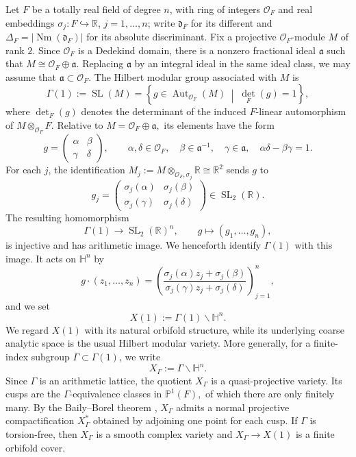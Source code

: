 \documentclass[12 pt]{amsart}
\theoremstyle{definition}
\newcommand{\Nm}{\operatorname{Nm}}
\newcommand{\Hu}{\mathbb{H}}
\begin{document}
Let $F$ be a totally real field of degree $n$, with ring of integers $\mathcal O_F$ and real embeddings $\sigma_j:F\hookrightarrow\mathbb R$, $j=1,\ldots,n$; write \(\mathfrak d_F\) for its different and \(\Delta_F=|\Nm(\mathfrak d_F)|\) for its absolute discriminant. Fix a projective $\mathcal O_F$-module $M$ of rank $2$. Since $\mathcal O_F$ is a Dedekind domain, there is a nonzero fractional ideal $\mathfrak a$ such that $M\cong\mathcal O_F\oplus\mathfrak a$. Replacing $\mathfrak a$ by an integral ideal in the same ideal class, we may assume that $\mathfrak a\subset\mathcal O_F.$ The Hilbert modular group associated with \(M\) is
\[
\Gamma(1):=\operatorname{SL}(M)
=
\left\{
g\in\operatorname{Aut}_{\mathcal O_F}(M)
\;\middle|\;
\operatorname{det}_{F}(g)=1
\right\},
\]
where \(\det_F(g)\) denotes the determinant of the induced
\(F\)-linear automorphism of \(M\otimes_{\mathcal O_F}F\).
Relative to
\(
M=\mathcal O_F\oplus\mathfrak a,
\)
its elements have the form
\[
g=
\begin{pmatrix}
\alpha&\beta\\
\gamma&\delta
\end{pmatrix},
\qquad
\alpha,\delta\in\mathcal O_F,\quad
\beta\in\mathfrak a^{-1},\quad
\gamma\in\mathfrak a,\quad
\alpha\delta-\beta\gamma=1.
\]
For each $j$, the identification
\(
M_j:=M\otimes_{\mathcal O_F,\sigma_j}\mathbb R\cong\mathbb R^2
\)
sends $g$ to
\[
g_j=
\begin{pmatrix}
\sigma_j(\alpha)&\sigma_j(\beta)\\
\sigma_j(\gamma)&\sigma_j(\delta)
\end{pmatrix}
\in\operatorname{SL}_2(\mathbb R).
\]
The resulting homomorphism
\[
\Gamma(1)\longrightarrow\operatorname{SL}_2(\mathbb R)^n,
\qquad
g\longmapsto(g_1,\ldots,g_n),
\]
is injective and has arithmetic image. We henceforth identify $\Gamma(1)$ with this image. It acts on $\Hu^n$ by
\[
g\cdot(z_1,\ldots,z_n)
=
\left(
\frac{\sigma_j(\alpha)z_j+\sigma_j(\beta)}
     {\sigma_j(\gamma)z_j+\sigma_j(\delta)}
\right)_{j=1}^n,
\]
and we set
\[
X(1):=\Gamma(1)\backslash\Hu^n.
\]
We regard $X(1)$ with its natural orbifold structure, while its underlying coarse analytic space is the
usual Hilbert modular variety.
More generally, for a finite-index subgroup $\Gamma\subset\Gamma(1)$, we write
\[
X_\Gamma:=\Gamma\backslash\Hu^n.
\]
Since $\Gamma$ is an arithmetic lattice, the quotient $X_\Gamma$ is a
quasi-projective variety. Its cusps are the $\Gamma$-equivalence classes
in $\mathbb P^1(F),$ of which there are only finitely many. By the
Baily--Borel theorem \cite{bb}, $X_\Gamma$ admits a normal projective
compactification
\(
X_\Gamma^*
\)
obtained by adjoining one point for each cusp.
If $\Gamma$ is torsion-free, then $X_\Gamma$ is a smooth complex variety and $X_\Gamma\to X(1)$ is a finite orbifold cover.
\end{document}
